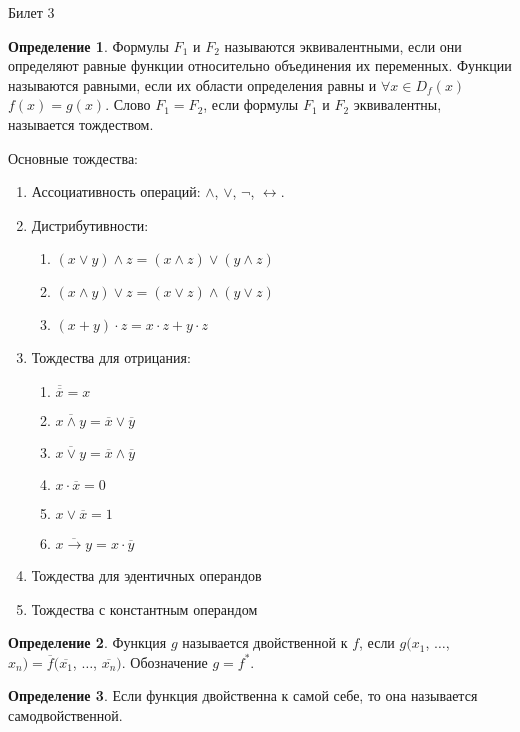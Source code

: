 \documentclass[a4paper, 12pt]{article}
\theoremstyle{definition}
\newtheorem*{definition}{Определение}
\theoremstyle{plain}
\theoremstyle{remark}
\begin{document}
  \begin{center}
    Билет 3
  \end{center}
  \begin{definition}
    Формулы $F_1$ и $F_2$ называются эквивалентными, если они определяют равные функции относительно объединения их переменных. Функции называются равными, если их области определения равны и $\forall x\in D_f(x)$ $f(x)=g(x)$. Слово $F_1=F_2$, если формулы $F_1$ и $F_2$ эквивалентны, называется тождеством. 
  \end{definition}
  Основные тождества:
  \begin{enumerate}
    \item Ассоциативность операций: $\wedge$, $\vee$, $\neg$, $\leftrightarrow$.
    \item Дистрибутивности:
    \begin{enumerate}
      \item $(x\vee y)\wedge z=(x\wedge z)\vee(y\wedge z)$
      \item $(x\wedge y)\vee z=(x\vee z)\wedge(y\vee z)$
      \item $(x+y)\cdot z=x\cdot z+y\cdot z$
    \end{enumerate}
    \item Тождества для отрицания: 
    \begin{enumerate}
      \item $\overline{\overline{x}}=x$
      \item $\overline{x\wedge y}=\overline{x}\vee \overline{y}$
      \item $\overline{x\vee y}=\overline{x}\wedge \overline{y}$
      \item $x\cdot\overline{x}=0$
      \item $x\vee\overline{x}=1$
      \item $\overline{x\rightarrow y}=x\cdot\overline{y}$
    \end{enumerate}
    \item Тождества для эдентичных операндов
    \item Тождества с константным операндом
  \end{enumerate}
  \begin{definition}
    Функция $g$ называется двойственной к $f$, если $g(x_1$, $\ldots$, $x_n)=\overline{f}(\overline{x_1}$, $\ldots$, $\overline{x_n})$. Обозначение $g=f^*$.
  \end{definition}
  \begin{definition}
    Если функция двойственна к самой себе, то она называется самодвойственной.
  \end{definition}
\end{document}
